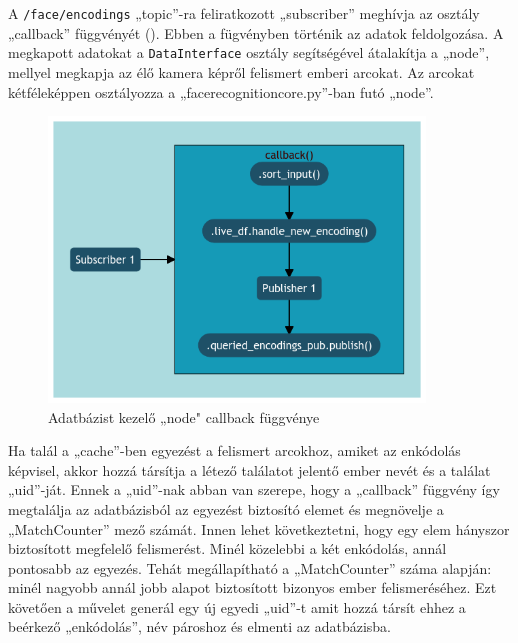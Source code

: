 A \verb|/face/encodings| „topic”-ra feliratkozott „subscriber” meghívja az osztály „callback” függvényét (). Ebben a fügvényben történik az adatok feldolgozása. A megkapott adatokat a \verb|DataInterface| osztály segítségével átalakítja a  „node”, mellyel megkapja az élő kamera képről felismert emberi arcokat. Az arcokat kétféleképpen osztályozza a „face\textunderscore recognition\textunderscore core.py”-ban futó „node”.
\begin{figure}[!ht]
    \centering
    \includegraphics[width=100mm, keepaspectratio]{02_mermaid/mermaid34_db_callback.png}
    \caption{Adatbázist kezelő „node" callback függvénye}
    \label{fig:dbcb}
\end{figure}

Ha talál a „cache”-ben egyezést a felismert arcokhoz, amiket az enkódolás képvisel, akkor hozzá társítja a létező találatot jelentő ember nevét és a találat „uid”-ját. Ennek a „uid”-nak abban van szerepe, hogy a „callback” függvény így megtalálja az adatbázisból az egyezést biztosító elemet és megnövelje a „MatchCounter” mező számát. Innen lehet következtetni, hogy egy elem hányszor biztosított megfelelő felismerést. Minél közelebbi a két enkódolás, annál pontosabb az egyezés. Tehát megállapítható a „MatchCounter” száma alapján: minél nagyobb annál jobb alapot biztosított bizonyos ember felismeréséhez. Ezt követően a művelet generál egy új egyedi „uid”-t amit hozzá társít ehhez a beérkező „enkódolás”, név pároshoz és elmenti az adatbázisba. 


